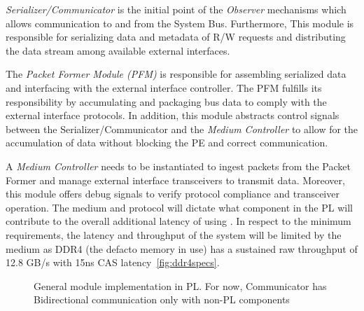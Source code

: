 \emph{Serializer/Communicator} is the initial point of the \emph{Observer} mechanisms which allows communication to and from the System Bus. Furthermore, This module is responsible for serializing data and metadata of R/W requests and distributing the data stream among available external interfaces. 

%


The \emph{Packet Former Module (PFM)} is responsible for assembling serialized data and interfacing with the external interface controller. The PFM fulfills its responsibility by accumulating and packaging bus data to comply with the external interface protocols. In addition, this module abstracts control signals between the Serializer/Communicator and the \emph{Medium Controller} to allow for the accumulation of data without blocking the PE and correct communication. 

A \emph{Medium Controller} needs to be instantiated to ingest packets from the Packet Former and manage external interface transceivers to transmit data. Moreover, this module offers debug signals to verify protocol compliance and transceiver operation. The medium and protocol will dictate what component in the PL will contribute to the overall additional latency of using \MethodNameShort. In respect to the minimum requirements, the latency and throughput of the system will be limited by the medium as DDR4 (the defacto memory in use) has a sustained raw throughput of 12.8 GB/s with 15ns CAS latency~\ref{fig:ddr4specs}.

\begin{figure}

        \caption{General module implementation in PL. For now, Communicator has Bidirectional communication only with non-PL components}
        \label{fig:PL_Module}
\end{figure}

